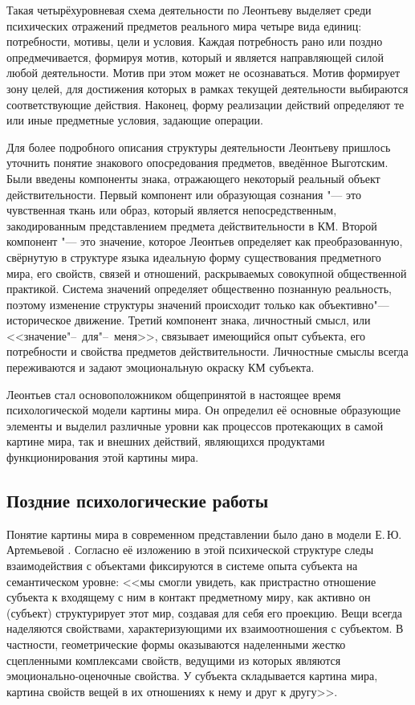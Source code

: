 Такая четырёхуровневая схема деятельности по Леонтьеву выделяет среди психических отражений предметов реального мира четыре вида единиц: потребности, мотивы, цели и условия. Каждая потребность рано или поздно опредмечивается, формируя мотив, который и является направляющей силой любой деятельности. Мотив при этом может не осознаваться. Мотив формирует зону целей, для достижения которых в рамках текущей деятельности выбираются соответствующие действия. Наконец, форму реализации действий определяют те или иные предметные условия, задающие операции.

Для более подробного описания структуры деятельности Леонтьеву пришлось уточнить понятие знакового опосредования предметов, введённое Выготским. Были введены компоненты знака, отражающего некоторый реальный объект действительности. Первый компонент или образующая сознания "--- это чувственная ткань или образ, который является непосредственным, закодированным представлением предмета действительности в КМ. Второй компонент "--- это значение, которое Леонтьев определяет как преобразованную, свёрнутую в структуре языка идеальную форму существования предметного мира, его свойств, связей и отношений, раскрываемых совокупной общественной практикой. Система значений определяет общественно познанную реальность, поэтому изменение структуры значений происходит только как объективно"---историческое движение. Третий компонент знака, личностный смысл, или <<значение"--~для"--~меня>>, связывает имеющийся опыт субъекта, его потребности и свойства предметов действительности. Личностные смыслы всегда переживаются и задают эмоциональную окраску КМ субъекта.

Леонтьев стал основоположником общепринятой в настоящее время психологической модели картины мира. Он определил её основные образующие элементы и выделил различные уровни как процессов протекающих в самой картине мира, так и внешних действий, являющихся продуктами функционирования этой картины мира.

\subsection{Поздние психологические работы} \label{subsect1_1_1}

Понятие картины мира в современном представлении было дано в модели Е.\,Ю. Артемьевой \cite{Artemyeva1980}. Согласно её изложению в этой психической структуре следы взаимодействия с объектами фиксируются в системе опыта субъекта на семантическом уровне: <<мы смогли увидеть, как пристрастно отношение субъекта к входящему с ним в контакт предметному миру, как активно он (субъект) структурирует этот мир, создавая для себя его проекцию. Вещи всегда наделяются свойствами, характеризующими их взаимоотношения с субъектом. В частности, геометрические формы оказываются наделенными жестко сцепленными комплексами свойств, ведущими из которых являются эмоционально-оценочные свойства. У субъекта складывается картина мира, картина свойств вещей в их отношениях к нему и друг к другу>>. 

